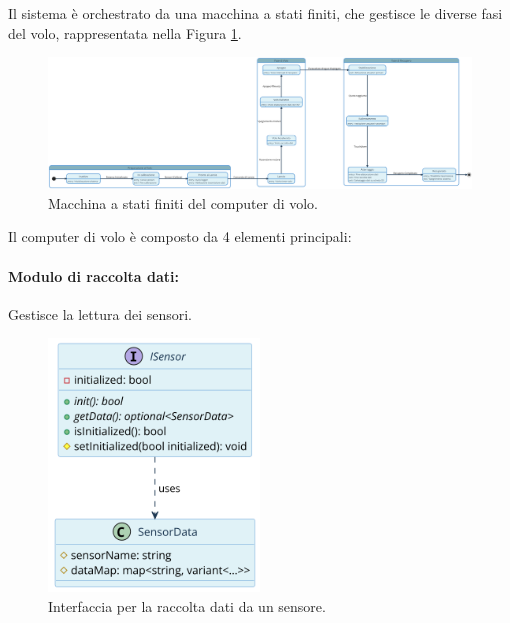 \documentclass[12pt,a4paper,twoside]{book}
\begin{document}
Il sistema è orchestrato da una macchina a stati finiti, che gestisce le diverse
fasi del volo, rappresentata nella Figura \ref{fig:flight-computer-fsm}.
\ifdefined\HCode
\else
    \begin{landscape}
        \fi
        \begin{figure}[H]
            \centering
            \vspace*{2cm}  %
            \hspace*{-4cm}
            \includegraphics[width=1.7\textwidth]{img/uml/fsm.png}
            \caption{Macchina a stati finiti del computer di volo.}
            \label{fig:flight-computer-fsm}
            \vspace*{-1cm}  %
        \end{figure}
        \thispagestyle{empty}  %
        \ifdefined\HCode
        \else
    \end{landscape}
\fi

\newpage
Il computer di volo è composto da 4 elementi principali:
\paragraph{\textbf{Modulo di raccolta dati:}} Gestisce la lettura dei sensori.
\begin{figure}[H]
    \centering
    \includegraphics[width=0.5\textwidth]{img/uml/sensor.png}
    \caption{Interfaccia per la raccolta dati da un sensore.}
    \label{fig:flight-computer-data-collection}
\end{figure}
\end{document}
